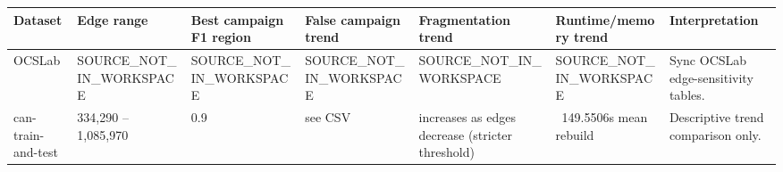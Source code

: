 \begin{tabular}{lllllll}
\toprule
Dataset & Edge range & Best campaign F1 region & False campaign trend & Fragmentation trend & Runtime/memory trend & Interpretation \\
\midrule
OCSLab & SOURCE_NOT_IN_WORKSPACE & SOURCE_NOT_IN_WORKSPACE & SOURCE_NOT_IN_WORKSPACE & SOURCE_NOT_IN_WORKSPACE & SOURCE_NOT_IN_WORKSPACE & Sync OCSLab edge-sensitivity tables. \\
can-train-and-test & 334,290 – 1,085,970 & 0.9 & see CSV & increases as edges decrease (stricter threshold) & ~149.5506s mean rebuild & Descriptive trend comparison only. \\
\bottomrule
\end{tabular}

